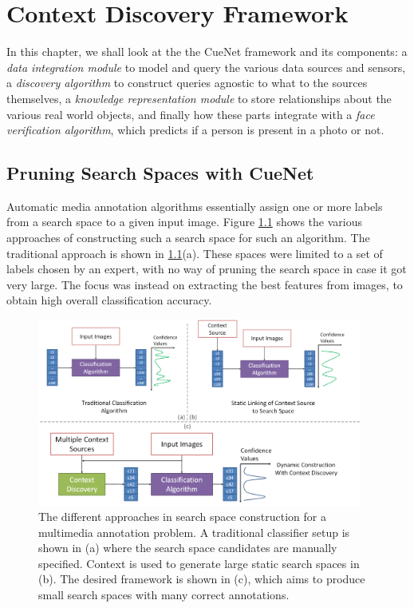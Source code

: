 \chapter{Context Discovery Framework}

In this chapter, we shall look at the the CueNet framework and its components: a \textit{data integration module} to model and query the various data sources and sensors, a \textit{discovery algorithm} to construct queries agnostic to what to the sources themselves, a \textit{knowledge representation module} to store relationships about the various real world objects, and finally how these parts integrate with a \textit{face verification algorithm}, which predicts if a person is present in a photo or not.

\section{Pruning Search Spaces with CueNet}

Automatic media annotation algorithms essentially assign one or more labels from a search space to a given input image. Figure \ref{fig:with-without-cuenet} shows the various approaches of constructing such a search space for such an algorithm. The traditional approach is shown in \ref{fig:with-without-cuenet}(a). These spaces were limited to a set of labels chosen by an expert, with no way of pruning the search space in case it got very large. The focus was instead on extracting the best features from images, to obtain high overall classification accuracy\cite{turk1991eigenfaces}.

\begin{figure}[t]
\centering
\includegraphics[width=0.95\textwidth]{media/with-without-cuenet-2.png}
\caption{The different approaches in search space construction for a multimedia annotation problem. A traditional classifier setup is shown in (a) where the search space candidates are manually specified. Context is used to generate large static search spaces in (b). The desired framework is shown in (c), which aims to produce small search spaces with many correct annotations.}
\label{fig:with-without-cuenet}
\end{figure}

